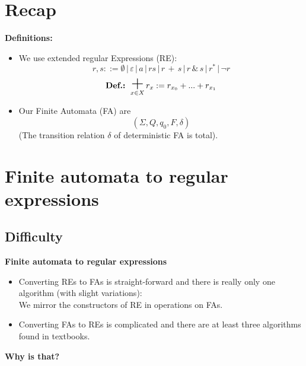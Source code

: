 \documentclass{beamer}
\DeclareMathOperator*{\bigplus}{\mbox{\huge +}}
\begin{document}
\section*{Recap}
\begin{frame}
    \textbf{Definitions:} \\
    
    \begin{itemize}
        \item 
            We use extended regular Expressions (RE):
            \[    
            r, s ::= \emptyset \, | \, \varepsilon \, | \,  a \, | \, rs \, | \,  r \,  + \, s \, | \, r \, \& \, s \, |\, r^* \, | \, \neg r
            \]
            \[
                \mbox{\textbf{Def.:} }  \bigplus_{x \in X} r_x := r_{x_0} + ... + r_{x_1}
            \]

        \item 
            Our Finite Automata (FA) are
            \[
                (\Sigma, Q, q_0, F, \delta)
            \]
        (The transition relation $\delta$ of deterministic FA is total).
    \end{itemize}
\end{frame}

\section*{Finite automata to regular expressions}
\subsection*{Difficulty}
\begin{frame}

    \large{\textbf{Finite automata to regular expressions}}

    \begin{itemize}
        \item
            Converting REs to FAs is straight-forward and there is really only one algorithm (with slight variations): \\
            We mirror the constructors of RE in operations on FAs.

            \pause

        \item
            Converting FAs to REs is complicated and there are at least three algorithms found in textbooks.
    \end{itemize}

    \pause

    \textbf{Why is that?}

\end{frame}
\end{document}
